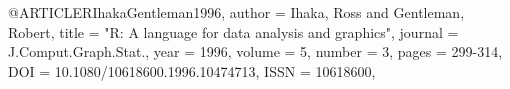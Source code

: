 
@ARTICLE{RIhakaGentleman1996,
      author = {{Ihaka}, Ross and {Gentleman}, Robert},
       title = "{R: A language for data analysis and graphics}",
     journal = {J.Comput.Graph.Stat.},
        year = {1996},
      volume = {5},
      number = {3},
       pages = {299-314},
         DOI = {10.1080/10618600.1996.10474713},
        ISSN = {10618600},
}

